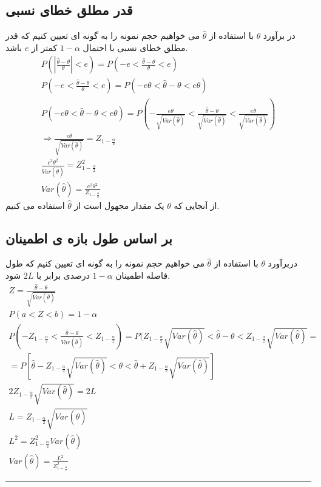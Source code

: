 \subsection{قدر مطلق خطای نسبی}
در برآورد 
$\theta$
با استفاده از 
$\hat{\theta}$
می خواهیم حجم نمونه را به گونه ای تعیین کنیم که قدر مطلق خطای نسبی با احتمال
$1-\alpha$
کمتر از 
$e$
باشد.
\begin{gather*}
	P(|\frac{\hat{\theta}-\theta}{\theta}|<e)=P(-e<\frac{\hat{\theta}-\theta}{\theta}<e) \\
	P(-e<\frac{\hat{\theta}-\theta}{\theta}<e)=P(-e\theta<\hat{\theta}-\theta<e\theta)\\
	P(-e\theta<\hat{\theta}-\theta<e\theta)=
	P(-\frac{e\theta}{\sqrt{Var(\hat{\theta})}}
	<\frac{\hat{\theta}-\theta}{\sqrt{Var(\hat{\theta})}}<
	\frac{e\theta}{\sqrt{Var(\hat{\theta})}})\\
	\Rightarrow \frac{e\theta}{\sqrt{Var(\hat{\theta})}}=Z_{1-\frac{\alpha}{2}} \\
	\frac{e^2\theta^2}{Var(\hat{\theta})}=Z^2_{1-\frac{\alpha}{2}} \\
	Var(\hat{\theta})=\frac{e^2\theta^2}{Z_{1-\frac{\alpha}{2}}} 
\end{gather*}
از آنجایی که 
$\theta$
یک مقدار مجهول است از 
$\hat{\theta}$
استفاده می کنیم.
\subsection*{بر اساس طول بازه ی اطمینان}
دربرآورد 
$\theta$
با استفاده از 
$\hat{\theta}$
می خواهیم حجم نمونه را به گونه ای تعیین کنیم که طول فاصله اطمینان 
$1-\alpha$
درصدی برابر با
$2L$
شود.
\begin{gather*}
	Z=\frac{\hat{\theta}-\theta}{\sqrt{Var(\hat{\theta})}} \\
	P(a<Z<b)=1-\alpha \\
	P(-Z_{1-\frac{\alpha}{2}}<\frac{\hat{\theta}-\theta}{Var(\hat{\theta})}<Z_{1-\frac{\alpha}{2}})
	=P(Z_{1-\frac{\alpha}{2}}\sqrt{Var(\hat{\theta})}
	<\hat{\theta}-\theta<
	Z_{1-\frac{\alpha}{2}}\sqrt{Var(\hat{\theta})} 
	=\\=
	P[\hat{\theta}-Z_{1-\frac{\alpha}{2}}\sqrt{Var(\hat{\theta})}
	<\theta<
	\hat{\theta}+Z_{1-\frac{\alpha}{2}}\sqrt{Var(\hat{\theta})}] \\
	2Z_{1-\frac{\alpha}{2}}\sqrt{Var(\hat{\theta})}=2L \\
	L=Z_{1-\frac{\alpha}{2}}\sqrt{Var(\hat{\theta})} \\
	L^2=Z^2_{1-\frac{\alpha}{2}}Var(\hat{\theta}) \\
	Var(\hat{\theta})=\frac{L^2}{Z^2_{1-\frac{\alpha}{2}}}
\end{gather*}
\rule{\textwidth}{0.4pt}